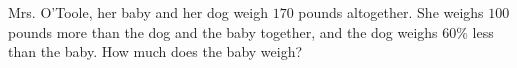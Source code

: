 Mrs. O'Toole, her baby and her dog weigh $170$ pounds altogether. She weighs $100$ pounds more than the dog and the baby together, and the dog weighs $60\%$ less than the baby. How much does the baby weigh?
